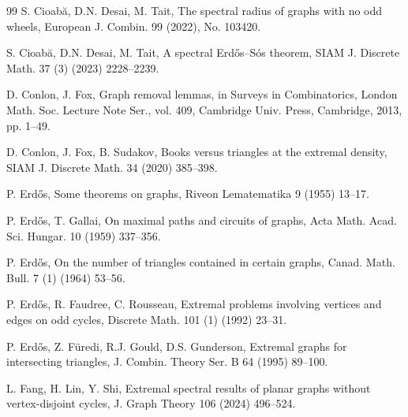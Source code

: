 \documentclass[11pt]{article}
\begin{document}
\begin{thebibliography}{99}
 S. Cioab\u{a}, D.N. Desai, M. Tait, 
The spectral radius of graphs with no odd wheels, 
European J. Combin. 99 (2022), No. 103420. 

  S. Cioab\u{a}, D.N. Desai, M. Tait,
 A spectral Erd\H{o}s--S\'{o}s theorem,
 SIAM J. Discrete Math. 37 (3) (2023) 2228--2239.
 
D. Conlon, J. Fox, Graph removal lemmas, in Surveys in Combinatorics, London Math. Soc. Lecture Note Ser., vol. 409, Cambridge Univ. Press, Cambridge, 2013, pp. 1--49.
 
 
D. Conlon, J. Fox, B. Sudakov, 
Books versus triangles at the extremal density, 
SIAM J. Discrete Math. 34 (2020) 385--398.

 


P. Erd\H{o}s, Some theorems on graphs,
Riveon Lematematika 9 (1955) 13--17. 

P. Erd\H{o}s, T. Gallai, On maximal paths and circuits of graphs, 
Acta Math. Acad. Sci. Hungar. 10 (1959) 337--356. 



P. Erd\H{o}s,  
On the number of triangles contained in certain graphs, 
Canad. Math. Bull. 7 (1) (1964) 53--56.  
 
 P. Erd\H{o}s, R. Faudree, C. Rousseau, 
 Extremal problems involving vertices and 
 edges on odd cycles, 
Discrete Math. 101 (1) (1992) 23--31.

P. Erd{\H{o}}s, Z. F\"uredi, R.J. Gould, D.S. Gunderson,
Extremal graphs for intersecting triangles, 
J. Combin. Theory Ser. B 64 (1995) 89--100.

L. Fang, H. Lin, Y. Shi, Extremal spectral results of planar graphs without vertex-disjoint cycles, J. Graph Theory  106 (2024) 496--524. 


\end{thebibliography}
\end{document}
